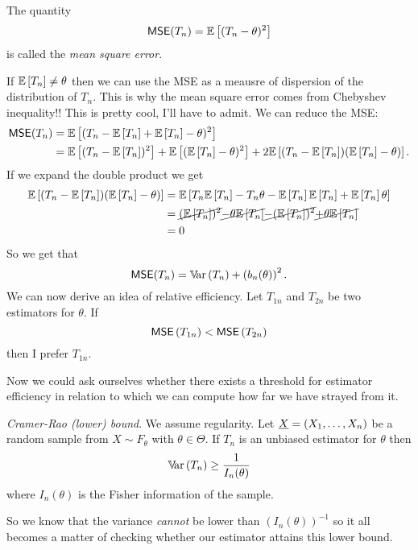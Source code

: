 \documentclass[12pt]{report}
\begin{document}
\begin{definition}
	The quantity
	\begin{equation*}
		\mathsf{MSE}(T_{n})=\mathbb{E}\left[(T_{n}-\theta)^{2}\right]
	\end{equation*}
	is called the \emph{mean square error}. 
\end{definition}
If $\mathbb{E}\left[T_{n}\right]\neq\theta$ then we can use the MSE as a meausre of dispersion of the distribution of $T_{n}$. This is why the mean square error comes from Chebyshev inequality!! This is pretty cool, I'll have to admit. We can reduce the MSE:
\begin{align*}
	\mathsf{MSE}(T_{n})&=\mathbb{E}\left[(T_{n}-\mathbb{E}\left[T_{n}\right]+\mathbb{E}\left[T_{n}\right]-\theta)^{2}\right]\\
	&=\mathbb{E}\left[(T_{n}-\mathbb{E}\left[T_{n}\right])^{2}\right]+\mathbb{E}\left[(\mathbb{E}\left[T_{n}\right]-\theta)^{2}\right]+2\mathbb{E}\left[(T_{n}-\mathbb{E}\left[T_{n}\right])(\mathbb{E}\left[T_{n}\right]-\theta)\right].
\end{align*}
If we expand the double product we get
\begin{align*}
	\mathbb{E}\left[(T_{n}-\mathbb{E}\left[T_{n}\right])(\mathbb{E}\left[T_{n}\right]-\theta)\right]&=\mathbb{E}\left[T_{n}\mathbb{E}\left[T_{n}\right]-T_{n}\theta-\mathbb{E}\left[T_{n}\right]\mathbb{E}\left[T_{n}\right]+\mathbb{E}\left[T_{n}\right]\theta\right]\\
	&=\cancel{(\mathbb{E}\left[T_{n}\right])^{2}}\cancel{-\theta\mathbb{E}\left[T_{n}\right]}\cancel{-(\mathbb{E}\left[T_{n}\right])^{2}}\cancel{+\theta\mathbb{E}\left[T_{n}\right]}\\
	&=0
\end{align*}
So we get that 
\begin{equation*}
	\mathsf{MSE}(T_{n})=\mathbb{V}\!\mathrm{ar}\,(T_{n})+\left(b_{n}(\theta)\right)^{2}.
\end{equation*}
We can now derive an idea of relative efficiency. Let $T_{1n}$ and $T_{2n}$ be two estimators for $\theta$. If
\begin{equation*}
	\mathsf{MSE}\left(T_{1n}\right)<\mathsf{MSE}\left(T_{2n}\right)
\end{equation*}
then I prefer $T_{1n}$.\par
Now we could ask ourselves whether there exists a threshold for estimator efficiency in relation to which we can compute how far we have strayed from it.
\begin{theorem}
	\emph{Cramer-Rao (lower) bound}. We assume regularity. Let $\underline{X}=(X_{1},\ldots,X_{n})$ be a random sample from $X\sim F_{\theta}$ with $\theta\in\Theta$. If $T_{n}$ is an unbiased estimator for $\theta$ then
	\begin{equation*}
		\mathbb{V}\!\mathrm{ar}\,(T_{n})\geq\frac{1}{I_{n}(\theta)}
	\end{equation*}
	where $I_{n}(\theta)$ is the Fisher information of the sample.
\end{theorem}
So we know that the variance \textit{cannot} be lower than $(I_{n}(\theta))^{-1}$ so it all becomes a matter of checking whether our estimator attains this lower bound.
\end{document}
